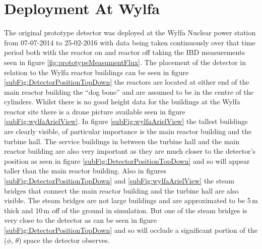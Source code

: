 
\section{Deployment At Wylfa}\label{sec:deploymentAtWylfa}
The original prototype detector was deployed at the Wylfa Nuclear power station from 07-07-2014 to 25-02-2016 with data being taken continuously over that time period both with the reactor on and reactor off taking the IBD measurements seen in figure \ref{fig:prototypeMeasumentFlux}. The placement of the detector in relation to the Wylfa reactor buildings can be seen in figure \ref{subFig:DetectorPositionTopDown} the reactors are located at either end of the main reactor building the ``dog bone'' and are assumed to be in the centre of the cylinders. Whilst there is no good height data for the buildings at the Wylfa reactor site there is a drone picture available seen in figure \ref{subFig:wylfaArielView}. In figure \ref{subFig:wylfaArielView} the tallest buildings are clearly visible, of particular importance is the main reactor building and the turbine hall. The service buildings in between the turbine hall and the  main reactor building are also very important as they are much closer to the detector's position as seen in figure \ref{subFig:DetectorPositionTopDown} and so will appear taller than the main reactor building. Also in figures \ref{subFig:DetectorPositionTopDown} and \ref{subFig:wylfaArielView} the steam bridges that connect the main reactor building and the turbine hall are also visible. The steam bridges are not large buildings and are approximated to be 5\,m thick and 10\,m off of the ground in simulation. But one of the steam bridges is very close to the detector as can be seen in figure \ref{subFig:DetectorPositionTopDown} and so will occlude a significant portion of the ($\phi$, $\theta$) space the detector observes. 


